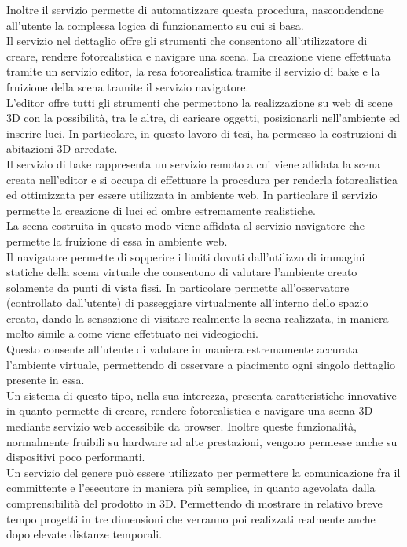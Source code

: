 Inoltre il servizio permette di automatizzare questa procedura, nascondendone all’utente la complessa logica di funzionamento su cui si basa.
\\
Il servizio nel dettaglio offre gli strumenti che consentono all’utilizzatore di creare, rendere fotorealistica e navigare una scena. 
La creazione viene effettuata tramite un servizio editor, la resa fotorealistica tramite il servizio di bake e la fruizione della scena tramite il servizio navigatore.
\\
L’editor offre tutti gli strumenti che permettono la realizzazione su web di scene 3D con la possibilità, tra le altre, di caricare oggetti, posizionarli nell’ambiente ed inserire luci. 
In particolare, in questo lavoro di tesi, ha permesso la costruzioni di abitazioni 3D arredate.
\\
Il servizio di bake rappresenta un servizio remoto a cui viene affidata la scena creata nell’editor e si occupa di effettuare la procedura per renderla fotorealistica ed ottimizzata per essere utilizzata in ambiente web. In particolare il servizio permette la creazione di luci ed ombre estremamente realistiche.
\\
La scena costruita in questo modo viene affidata al servizio navigatore che permette la fruizione di essa in ambiente web.
\\
Il navigatore  permette di sopperire i limiti dovuti dall’utilizzo di immagini statiche della scena virtuale che consentono di valutare l’ambiente creato solamente da punti di vista fissi.
In particolare permette all’osservatore (controllato dall’utente) di passeggiare virtualmente all’interno dello spazio creato, dando la sensazione di visitare realmente la scena realizzata, in maniera molto simile a come viene effettuato nei videogiochi.
\\
Questo consente all’utente di valutare in maniera estremamente accurata l’ambiente virtuale, permettendo di osservare a piacimento ogni singolo dettaglio presente in essa.
\\
Un sistema di questo tipo, nella sua interezza, presenta caratteristiche innovative in quanto permette di creare, rendere fotorealistica e navigare una scena 3D mediante servizio web accessibile da browser. Inoltre queste funzionalità, normalmente fruibili su hardware ad alte prestazioni, vengono permesse anche su dispositivi poco performanti.
\\
Un servizio del genere può essere utilizzato per permettere la comunicazione fra il committente e l’esecutore in maniera più semplice, in quanto agevolata dalla comprensibilità del prodotto in 3D. Permettendo di mostrare in relativo breve tempo progetti in tre dimensioni che verranno poi realizzati realmente anche dopo elevate distanze temporali.
